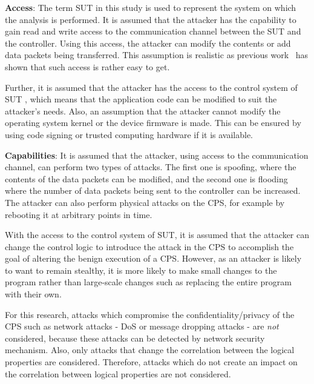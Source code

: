 {\bf Access}: The term \ac{SUT} in this study is used to represent the system on which the analysis is performed. It is assumed that the attacker has the capability to gain read and write access to the communication channel between the \ac{SUT} and the controller. Using this access, the attacker can modify the contents or add data packets being transferred. This assumption is realistic as previous work~\cite{davanian2017diversity, ericsson2010cyber} has shown that such access is rather easy to get.

Further, it is assumed that the attacker has the access to the control system of \ac{SUT} \cite{alemzadeh2016targeted}, which means that the application code can be modified to suit the attacker's needs. Also, an assumption that the attacker cannot modify the operating system kernel or the device firmware is made. This can be ensured by using code signing or trusted computing hardware\cite{seshadri2005pioneer} if it is available. 

{\bf Capabilities}: It is assumed that the attacker, using access to the communication channel, can perform two types of attacks. The first one is spoofing, where the contents of the data packets can be modified, and the second one is flooding where the number of data packets being sent to the controller can be increased. The attacker can also perform physical attacks on the \ac{CPS}, for example by rebooting it at arbitrary points in time. 

With the access to the control system of \ac{SUT}, it is assumed that the attacker can change the control logic to introduce the attack in the \ac{CPS} to accomplish the goal of altering the benign execution of a \ac{CPS}. However, as an attacker is likely to want to remain stealthy, it is more likely to make small changes to the program rather than large-scale changes such as replacing the entire program with their own. 
 
For this research, attacks which compromise the confidentiality/privacy of the \ac{CPS} such as network attacks - \ac{DoS} or message dropping attacks - are \textit{not} considered, because these attacks can be detected by network security mechanism. Also, only attacks that change the correlation between the logical properties are considered. Therefore, attacks which do not create an impact on the correlation between logical properties are not considered. 

